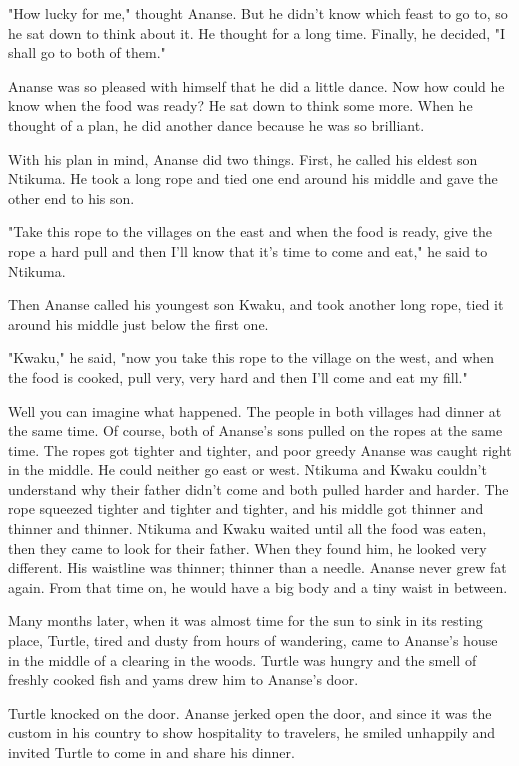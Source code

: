 "How lucky for me," thought Ananse. But he didn't know which feast to go to, so he sat down to think about it. He thought for a long time. Finally, he decided, "I shall go to both of them."

Ananse was so pleased with himself that he did a little dance. Now how could he know when the food was ready? He sat down to think some more. When he thought of a plan, he did another dance because he was so brilliant.

With his plan in mind, Ananse did two things. First, he called his eldest son Ntikuma. He took a long rope and tied one end around his middle and gave the other end to his son.

"Take this rope to the villages on the east and when the food is ready, give the rope a hard pull and then I'll know that it's time to come and eat," he said to Ntikuma.

Then Ananse called his youngest son Kwaku, and took another long rope, tied it around his middle just below the first one.

"Kwaku," he said, "now you take this rope to the village on the west, and when the food is cooked, pull very, very hard and then I'll come and eat my fill."

Well you can imagine what happened. The people in both villages had dinner at the same time. Of course, both of Ananse's sons pulled on the ropes at the same time. The ropes got tighter and tighter, and poor greedy Ananse was caught right in the middle. He could neither go east or west. Ntikuma and Kwaku couldn't understand why their father didn't come and both pulled harder and harder. The rope squeezed tighter and tighter and tighter, and his middle got thinner and thinner and thinner. Ntikuma and Kwaku waited until all the food was eaten, then they came to look for their father. When they found him, he looked very different. His waistline was thinner; thinner than a needle. Ananse never grew fat again. From that time on, he would have a big body and a tiny waist in between.

Many months later, when it was almost time for the sun to sink in its resting place, Turtle, tired and dusty from hours of wandering, came to Ananse's house in the middle of a clearing in the woods. Turtle was hungry and the smell of freshly cooked fish and yams drew him to Ananse's door.

Turtle knocked on the door. Ananse jerked open the door, and since it was the custom in his country to show hospitality to travelers, he smiled unhappily and invited Turtle to come in and share his dinner.


